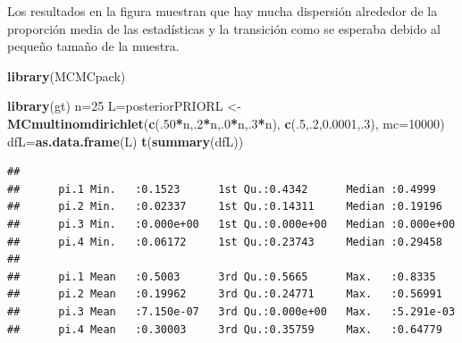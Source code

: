 \documentclass[
]{book}
\newenvironment{Shaded}{\begin{snugshade}}{\end{snugshade}}
\newcommand{\AttributeTok}[1]{\textcolor[rgb]{0.13,0.29,0.53}{#1}}
\newcommand{\DecValTok}[1]{\textcolor[rgb]{0.00,0.00,0.81}{#1}}
\newcommand{\FloatTok}[1]{\textcolor[rgb]{0.00,0.00,0.81}{#1}}
\newcommand{\FunctionTok}[1]{\textcolor[rgb]{0.13,0.29,0.53}{\textbf{#1}}}
\newcommand{\NormalTok}[1]{#1}
\newcommand{\OtherTok}[1]{\textcolor[rgb]{0.56,0.35,0.01}{#1}}
\newcommand{\SpecialCharTok}[1]{\textcolor[rgb]{0.81,0.36,0.00}{\textbf{#1}}}
\theoremstyle{definition}
\theoremstyle{definition}
\theoremstyle{definition}
\theoremstyle{definition}
\theoremstyle{remark}
\begin{document}
Los resultados en la figura muestran que hay mucha dispersión alrededor de la proporción media de las estadísticas y la transición como se esperaba debido al pequeño tamaño de la muestra.

\begin{Shaded}
\begin{Highlighting}[]
\FunctionTok{library}\NormalTok{(MCMCpack)}
\end{Highlighting}
\end{Shaded}

\begin{Shaded}
\begin{Highlighting}[]
\FunctionTok{library}\NormalTok{(gt)}
\NormalTok{n}\OtherTok{=}\DecValTok{25}
\NormalTok{L}\OtherTok{=}\NormalTok{posteriorPRIORL }\OtherTok{\textless{}{-}} \FunctionTok{MCmultinomdirichlet}\NormalTok{(}\FunctionTok{c}\NormalTok{(.}\DecValTok{50}\SpecialCharTok{*}\NormalTok{n,.}\DecValTok{2}\SpecialCharTok{*}\NormalTok{n,.}\DecValTok{0}\SpecialCharTok{*}\NormalTok{n,.}\DecValTok{3}\SpecialCharTok{*}\NormalTok{n), }\FunctionTok{c}\NormalTok{(.}\DecValTok{5}\NormalTok{,.}\DecValTok{2}\NormalTok{,}\FloatTok{0.0001}\NormalTok{,.}\DecValTok{3}\NormalTok{), }\AttributeTok{mc=}\DecValTok{10000}\NormalTok{)}
\NormalTok{dfL}\OtherTok{=}\FunctionTok{as.data.frame}\NormalTok{(L)}
\FunctionTok{t}\NormalTok{(}\FunctionTok{summary}\NormalTok{(dfL))}
\end{Highlighting}
\end{Shaded}

\begin{verbatim}
##                                                                      
##      pi.1 Min.   :0.1523      1st Qu.:0.4342      Median :0.4999     
##      pi.2 Min.   :0.02337     1st Qu.:0.14311     Median :0.19196    
##      pi.3 Min.   :0.000e+00   1st Qu.:0.000e+00   Median :0.000e+00  
##      pi.4 Min.   :0.06172     1st Qu.:0.23743     Median :0.29458    
##                                                                      
##      pi.1 Mean   :0.5003      3rd Qu.:0.5665      Max.   :0.8335     
##      pi.2 Mean   :0.19962     3rd Qu.:0.24771     Max.   :0.56991    
##      pi.3 Mean   :7.150e-07   3rd Qu.:0.000e+00   Max.   :5.291e-03  
##      pi.4 Mean   :0.30003     3rd Qu.:0.35759     Max.   :0.64779
\end{verbatim}
\end{document}
